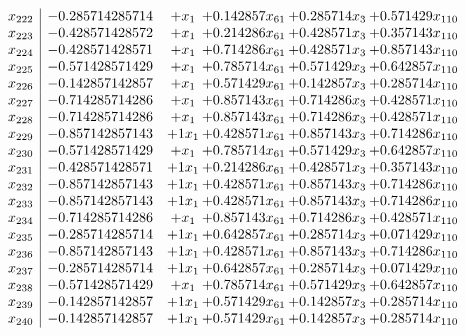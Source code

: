 \documentclass[11pt]{article}
\begin{document}
\[\begin{array}{c| c c@{\hskip 2pt} c@{\hskip 2pt} c@{\hskip 2pt} c@{\hskip 2pt} }
 x_{222}   &  -0.285714285714 & +  x_{1} & + 0.142857 x_{61} & + 0.285714 x_{3} & + 0.571429 x_{110}\\
 x_{223}   &  -0.428571428572 & +  x_{1} & + 0.214286 x_{61} & + 0.428571 x_{3} & + 0.357143 x_{110}\\
 x_{224}   &  -0.428571428571 & +  x_{1} & + 0.714286 x_{61} & + 0.428571 x_{3} & + 0.857143 x_{110}\\
 x_{225}   &  -0.571428571429 & +  x_{1} & + 0.785714 x_{61} & + 0.571429 x_{3} & + 0.642857 x_{110}\\
 x_{226}   &  -0.142857142857 & +  x_{1} & + 0.571429 x_{61} & + 0.142857 x_{3} & + 0.285714 x_{110}\\
 x_{227}   &  -0.714285714286 & +  x_{1} & + 0.857143 x_{61} & + 0.714286 x_{3} & + 0.428571 x_{110}\\
 x_{228}   &  -0.714285714286 & +  x_{1} & + 0.857143 x_{61} & + 0.714286 x_{3} & + 0.428571 x_{110}\\
 x_{229}   &  -0.857142857143 & + 1 x_{1} & + 0.428571 x_{61} & + 0.857143 x_{3} & + 0.714286 x_{110}\\
 x_{230}   &  -0.571428571429 & +  x_{1} & + 0.785714 x_{61} & + 0.571429 x_{3} & + 0.642857 x_{110}\\
 x_{231}   &  -0.428571428571 & + 1 x_{1} & + 0.214286 x_{61} & + 0.428571 x_{3} & + 0.357143 x_{110}\\
 x_{232}   &  -0.857142857143 & + 1 x_{1} & + 0.428571 x_{61} & + 0.857143 x_{3} & + 0.714286 x_{110}\\
 x_{233}   &  -0.857142857143 & + 1 x_{1} & + 0.428571 x_{61} & + 0.857143 x_{3} & + 0.714286 x_{110}\\
 x_{234}   &  -0.714285714286 & +  x_{1} & + 0.857143 x_{61} & + 0.714286 x_{3} & + 0.428571 x_{110}\\
 x_{235}   &  -0.285714285714 & + 1 x_{1} & + 0.642857 x_{61} & + 0.285714 x_{3} & + 0.071429 x_{110}\\
 x_{236}   &  -0.857142857143 & + 1 x_{1} & + 0.428571 x_{61} & + 0.857143 x_{3} & + 0.714286 x_{110}\\
 x_{237}   &  -0.285714285714 & + 1 x_{1} & + 0.642857 x_{61} & + 0.285714 x_{3} & + 0.071429 x_{110}\\
 x_{238}   &  -0.571428571429 & +  x_{1} & + 0.785714 x_{61} & + 0.571429 x_{3} & + 0.642857 x_{110}\\
 x_{239}   &  -0.142857142857 & + 1 x_{1} & + 0.571429 x_{61} & + 0.142857 x_{3} & + 0.285714 x_{110}\\
 x_{240}   &  -0.142857142857 & + 1 x_{1} & + 0.571429 x_{61} & + 0.142857 x_{3} & + 0.285714 x_{110}\\

\end{array}\]
\end{document}
